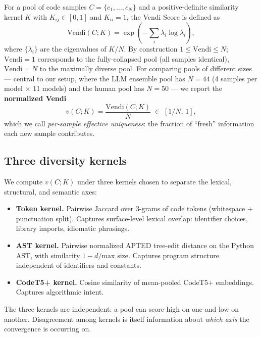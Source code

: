 \documentclass{article}
\begin{document}
For a pool of code samples $C=\{c_1,\dots,c_N\}$ and a positive-definite
similarity kernel $K$ with $K_{ij}\in[0,1]$ and $K_{ii}=1$, the Vendi Score
is defined as
\begin{equation}
\mathrm{Vendi}(C;K) = \exp\!\left(-\sum_i \lambda_i \log \lambda_i\right),
\label{eq:vendi}
\end{equation}
where $\{\lambda_i\}$ are the eigenvalues of $K/N$. By construction
$1\le\mathrm{Vendi}\le N$; $\mathrm{Vendi}=1$ corresponds to the
fully-collapsed pool (all samples identical), $\mathrm{Vendi}=N$ to the
maximally diverse pool. For comparing pools of different sizes --- central to
our setup, where the LLM ensemble pool has $N=44$ (4 samples per model
$\times$ 11 models) and the human pool has $N=50$ --- we report the
\textbf{normalized Vendi}
\begin{equation}
v(C;K) = \frac{\mathrm{Vendi}(C;K)}{N}\;\in\;[1/N,\,1],
\label{eq:vendi-norm}
\end{equation}
which we call \emph{per-sample effective uniqueness}: the fraction of
``fresh'' information each new sample contributes.

\subsection{Three diversity kernels}

We compute $v(C;K)$ under three kernels chosen to separate the lexical,
structural, and semantic axes:

\begin{itemize}[leftmargin=*]
  \item \textbf{Token kernel.} Pairwise Jaccard over 3-grams of code tokens
    (whitespace + punctuation split). Captures surface-level lexical overlap:
    identifier choices, library imports, idiomatic phrasings.
  \item \textbf{AST kernel.} Pairwise normalized APTED tree-edit distance
    \citep{pawlik2016apted} on the Python AST, with similarity
    $1-d/\mathrm{max\_size}$. Captures program structure independent of
    identifiers and constants.
  \item \textbf{CodeT5+ kernel.} Cosine similarity of mean-pooled CodeT5+
    \citep{wang2023codet5p} embeddings. Captures algorithmic intent.
\end{itemize}

The three kernels are independent: a pool can score high on one and low on
another. Disagreement among kernels is itself information about \emph{which
axis} the convergence is occurring on.
\end{document}
